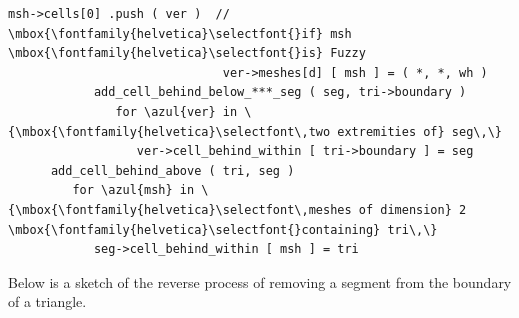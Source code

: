 \begin{Verbatim}[commandchars=\\\{\},formatcom=\small\tt,baselinestretch=0.94]
                              msh->cells[0] .push ( ver )  // \mbox{\fontfamily{helvetica}\selectfont{}if} msh \mbox{\fontfamily{helvetica}\selectfont{}is} Fuzzy
                              ver->meshes[d] [ msh ] = ( *, *, wh )
            add_cell_behind_below_***_seg ( seg, tri->boundary )
               for \azul{ver} in \{\mbox{\fontfamily{helvetica}\selectfont\,two extremities of} seg\,\}
                  ver->cell_behind_within [ tri->boundary ] = seg
      add_cell_behind_above ( tri, seg )
         for \azul{msh} in \{\mbox{\fontfamily{helvetica}\selectfont\,meshes of dimension} 2 \mbox{\fontfamily{helvetica}\selectfont{}containing} tri\,\}
            seg->cell_behind_within [ msh ] = tri
\end{Verbatim}

Below is a sketch of the reverse process of removing a segment from the boundary of a triangle.

